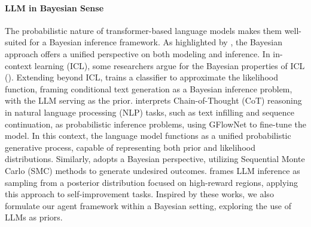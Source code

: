 \documentclass{article} %
\theoremstyle{plain}
\theoremstyle{definition}
\theoremstyle{remark}
\begin{document}
{{\paragraph{LLM in Bayesian Sense}
The probabilistic nature of transformer-based language models makes them well-suited for a Bayesian inference framework. As highlighted by \citep{korbak2022rl}, the Bayesian approach offers a unified perspective on both modeling and inference. In in-context learning (ICL), some researchers argue for the Bayesian properties of ICL (\citep{jiang2023latent, wang2024large, ye2024pre}). Extending beyond ICL, \citep{yang2021fudge} trains a classifier to approximate the likelihood function, framing conditional text generation as a Bayesian inference problem, with the LLM serving as the prior. \citep{hu2023amortizing} interprets Chain-of-Thought (CoT) reasoning in natural language processing (NLP) tasks, such as text infilling and sequence continuation, as probabilistic inference problems, using GFlowNet to fine-tune the model. In this context, the language model functions as a unified probabilistic generative process, capable of representing both prior and likelihood distributions. Similarly, \citep{zhao2024probabilistic} adopts a Bayesian perspective, utilizing Sequential Monte Carlo (SMC) methods to generate undesired outcomes. \citep{gallego2024distilled} frames LLM inference as sampling from a posterior distribution focused on high-reward regions, applying this approach to self-improvement tasks. Inspired by these works, we also formulate our agent framework within a Bayesian setting, exploring the use of LLMs as priors.





}}
\end{document}
